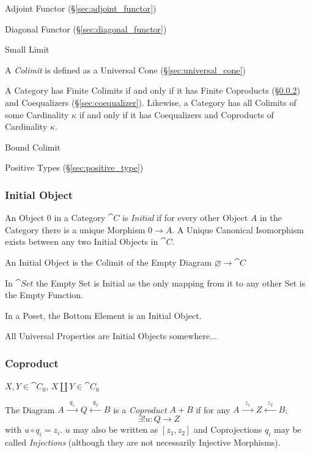 Adjoint Functor (\S\ref{sec:adjoint_functor})

Diagonal Functor (\S\ref{sec:diagonal_functor})

Small Limit

A \emph{Colimit} is defined as a Universal Cone
(\S\ref{sec:universal_cone})

A Category has Finite Colimits if and only if it has Finite Coproducts
(\S\ref{sec:coproduct}) and Coequalizers (\S\ref{sec:coequalizer}).
Likewise, a Category has all Colimits of some Cardinality $\kappa$ if
and only if it has Coequalizers and Coproducts of Cardinality
$\kappa$.

Bound Colimit %

Positive Types (\S\ref{sec:positive_type})



\subsubsection{Initial Object}\label{sec:initial_object}

An Object $0$ in a Category $\cat{C}$ is \emph{Initial} if for
every other Object $A$ in the Category there is a unique Morphism $0
\rightarrow A$. A Unique Canonical Isomorphism exists between any two
Initial Objects in $\cat{C}$.

An Initial Object is the Colimit of the Empty Diagram $\varnothing
\rightarrow \cat{C}$

In $\cat{Set}$ the Empty Set is Initial as the only mapping from it
to any other Set is the Empty Function.

In a Poset, the Bottom Element is an Initial Object.

All Universal Properties are Initial Objects somewhere...



\subsubsection{Coproduct}\label{sec:coproduct}

$X,Y \in \cat{C}_0$, $X \amalg Y \in \cat{C}_0$

The Diagram $A \xrightarrow{\;\;q_1\;\;} Q \xleftarrow{\;\;q_2\;\;} B$
is a \emph{Coproduct} $A + B$ if for any $A \xrightarrow{\;\;z_1\;\;}
Z \xleftarrow{\;\;z_2\;\;} B$:
\[
  \exists!u : Q \rightarrow Z
\]
with $u \circ q_i = z_i$. $u$ may also be written as $[ z_1, z_2 ]$
and Coprojections $q_i$ may be called \emph{Injections} (although they
are not necessarily Injective Morphisms).

